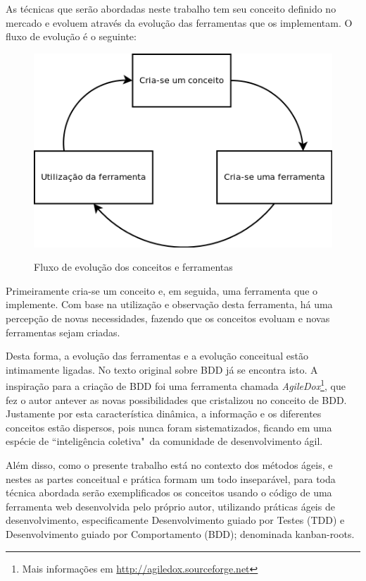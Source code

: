 As técnicas que serão abordadas neste trabalho tem seu conceito definido no mercado e evoluem através da evolução das ferramentas que os implementam. O fluxo de evolução é o seguinte:

\begin{figure}[h]
  \center
  \caption{Fluxo de evolução dos conceitos e ferramentas}
  \includegraphics[scale=0.60]{images/fluxo-conceito-ferramenta}
  \label{img:fluxo_conceito_ferramenta}
\end{figure}

Primeiramente cria-se um conceito e, em seguida, uma ferramenta que o implemente. Com base na utilização e observação desta ferramenta, há uma percepção de novas necessidades, fazendo que os conceitos evoluam e novas ferramentas sejam criadas.

Desta forma, a evolução das ferramentas e a evolução conceitual estão intimamente ligadas. No texto original sobre BDD \cite{IntroducingBDD} já se encontra isto. A inspiração para a criação de BDD foi uma ferramenta chamada \textit{AgileDox}\footnote{Mais informações em \url{http://agiledox.sourceforge.net}}, que fez o autor antever as novas possibilidades que cristalizou no conceito de BDD. Justamente por esta característica dinâmica, a informação e os diferentes conceitos estão dispersos, pois nunca foram sistematizados, ficando em uma espécie de ``inteligência coletiva"\ da comunidade de desenvolvimento ágil.

Além disso, como o presente trabalho está no contexto dos métodos ágeis, e nestes as partes conceitual e prática formam um todo inseparável, para toda técnica abordada serão exemplificados os conceitos usando o código de uma ferramenta web desenvolvida pelo próprio autor, utilizando práticas ágeis de desenvolvimento, especificamente Desenvolvimento guiado por Testes (TDD) e Desenvolvimento guiado por Comportamento (BDD); denominada kanban-roots.

